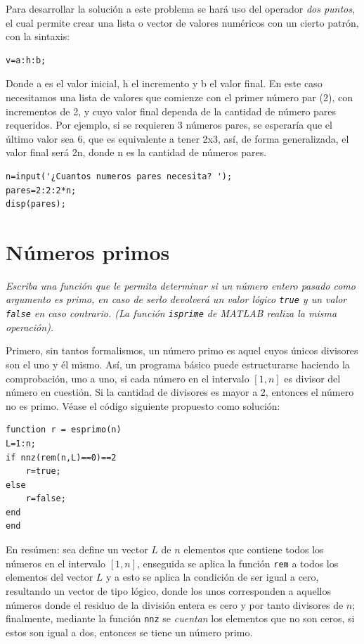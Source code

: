 \sol

Para desarrollar la solución a este problema se hará uso del operador {\it dos puntos}, el cual 
permite crear una lista o vector de valores numéricos con un cierto patrón, con la sintaxis:

\begin{verbatim}
v=a:h:b;
\end{verbatim}

Donde a es el valor inicial, h el incremento y b el valor final. En este caso necesitamos una lista 
de valores que comienze con el primer número par (2), con incrementos de 2, y cuyo valor final dependa 
de la cantidad de número pares requeridos. Por ejemplo, si se requieren 3 números pares, se esperaría que 
el último valor sea 6, que es equivalente a tener 2x3, así, de forma generalizada, el valor final será 
2n, donde n es la cantidad de números pares.

\begin{verbatim}
n=input('¿Cuantos numeros pares necesita? ');
pares=2:2:2*n;
disp(pares);
\end{verbatim}


\section{Números primos} 

\textit{Escriba una función que le permita determinar si un número entero pasado como argumento 
es primo, en caso de serlo devolverá un valor lógico {\tt true} y un valor {\tt false} en caso contrario. 
(La función {\tt isprime} de MATLAB realiza la misma operación).}

\sol

Primero, sin tantos formalismos, un número primo es aquel cuyos únicos divisores son el uno y él mismo. 
Así, un programa básico puede estructurarse haciendo la comprobación, uno a uno, si cada número en el intervalo 
$[1, n]$ es divisor del número en cuestión. Si la cantidad de divisores es mayor a 2, entonces el número 
no es primo. Véase el código siguiente propuesto como solución:

\begin{verbatim}
function r = esprimo(n)
L=1:n;
if nnz(rem(n,L)==0)==2
    r=true;
else
    r=false;
end
end
\end{verbatim}

En resúmen: sea define un vector $L$ de $n$ elementos que contiene todos los números en el intervalo $[1,n]$, 
enseguida se aplica la función {\tt rem} a todos los elementos del vector $L$ y a esto se aplica la condición 
de ser igual a cero, resultando un vector de tipo lógico, donde los unos corresponden a aquellos números donde 
el residuo de la división entera es cero y por tanto divisores de $n$; finalmente, mediante la función 
{\tt nnz} se {\it cuentan} los elementos que no son ceros, si estos son igual a dos, entonces se tiene un 
número primo.

